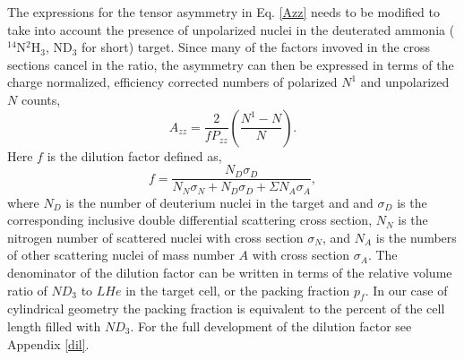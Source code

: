 \documentclass[12pt]{article}
\begin{document}

The expressions for the tensor asymmetry in Eq. \ref{Azz} needs to be modified to take into account the presence of
unpolarized nuclei in the deuterated ammonia ($^{14}$N$^2$H$_3$, ND$_3$ for 
short) target. Since many of the factors invoved in the cross sections cancel in
the ratio, the asymmetry can then be expressed in terms 
of the charge normalized, efficiency corrected numbers of polarized $N^1$ and 
unpolarized $N$ counts, 
\begin{equation} \label{3}
A_{zz}=\frac{2}{fP_{zz}}\left(\frac{N^1-N}{N}\right).
\end{equation}
Here $f$ is the dilution factor defined as,
\begin{equation}
f=\frac{N_D\sigma_D}{N_N\sigma_N+N_D\sigma_D+\Sigma N_A\sigma_A},
\end{equation}
where $N_D$ is the number of deuterium nuclei in the target and and $\sigma_D$ 
is the corresponding inclusive double differential scattering cross 
section,
$N_N$ is the nitrogen number of scattered nuclei with cross section $\sigma_N$, and
$N_A$ is the numbers of other scattering nuclei of mass number $A$ with cross section $\sigma_A$.
The denominator of the dilution factor can be written in terms of the relative volume ratio of
$ND_3$ to $LHe$ in the target cell, or the packing fraction $p_f$.  In our case of cylindrical geometry
the packing fraction is equivalent to the percent of the cell length filled with $ND_3$.  For the
full development of the dilution factor see Appendix \ref{dil}.
\end{document}

